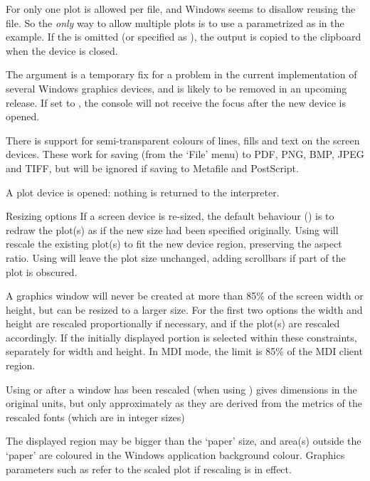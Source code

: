 \begin{Details}
For  only one plot is allowed per file, and Windows
seems to disallow reusing the file.  So the \emph{only} way to allow
multiple plots is to use a parametrized  as in the
example.  If the  is omitted (or specified as
), the output is copied to the clipboard when the device is
closed.

The  argument is a temporary fix for a problem
in the current implementation of several Windows graphics devices,
and is likely to be removed in an upcoming release.  If set to
, the console will not receive the focus after the new
device is opened.  

There is support for semi-transparent colours of lines, fills and text
on the screen devices.  These work for saving (from the
`File' menu) to PDF, PNG, BMP, JPEG and TIFF, but will be ignored if
saving to Metafile and PostScript.
\end{Details}
%
\begin{Value}
A plot device is opened: nothing is returned to the \R{} interpreter.
\end{Value}
%
\begin{Section}{Resizing options}
If a screen device is re-sized, the default behaviour () is
to redraw the plot(s) as if the new size had been specified
originally.  Using  will rescale the existing plot(s) to
fit the new device region, preserving the aspect ratio.  Using
 will leave the plot size unchanged, adding scrollbars
if part of the plot is obscured.

A graphics window will never be created at more than 85\% of
the screen width or height, but can be resized to a larger size.
For the first two  options the width and height are
rescaled proportionally if necessary, and if 
the plot(s) are rescaled accordingly.  If 
the initially displayed portion is selected within these constraints,
separately for width and height.  In MDI mode,
the limit is 85\% of the MDI client region.

Using  or  after a window
has been rescaled (when using ) gives dimensions in the
original units, but only approximately as they are derived from the
metrics of the rescaled fonts (which are in integer sizes)

The displayed region may be bigger than the `paper' size, and
area(s) outside the `paper' are coloured in the Windows
application background colour.  Graphics parameters such as
 refer to the scaled plot if rescaling is in effect.
\end{Section}
